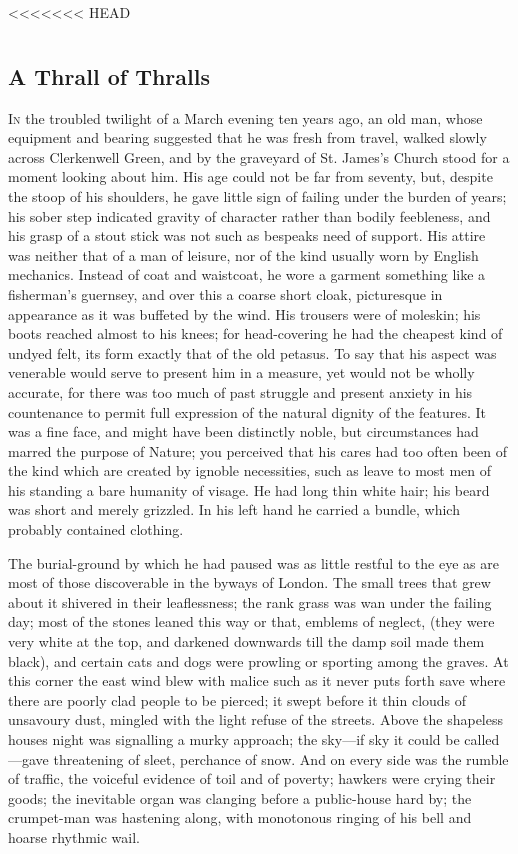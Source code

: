 <<<<<<< HEAD
\part{}

\chapter{A Thrall of Thralls}

\textsc{In} the troubled twilight of a March evening ten years ago, an
old man, whose equipment and bearing suggested that he was fresh from
travel, walked slowly across Clerkenwell Green, and by the graveyard of
St. James's Church stood for a moment looking about him. His age could
not be far from seventy, but, despite the stoop of his shoulders, he
gave little sign of failing under the burden of years; his sober step
indicated gravity of character rather than bodily feebleness, and his
grasp of a stout stick was not such as bespeaks need of support. His
attire was neither that of a man of leisure, nor of the kind usually
worn by English {}mechanics. Instead of coat and waistcoat, he wore a
garment something like a fisherman's guernsey, and over this a coarse
short cloak, picturesque in appearance as it was buffeted by the wind.
His trousers were of moleskin; his boots reached almost to his knees;
for head-covering he had the cheapest kind of undyed felt, its form
exactly that of the old petasus. To say that his aspect was venerable
would serve to present him in a measure, yet would not be wholly
accurate, for there was too much of past struggle and present anxiety in
his countenance to permit full expression of the natural dignity of the
features. It was a fine face, and might have been distinctly noble, but
circumstances had marred the purpose of Nature; you perceived that his
cares had too often been of the kind which are created by ignoble
necessities, such as leave to most men of his standing a bare humanity
of visage. He had long thin white hair; his beard was short and merely
grizzled. In his left hand he carried a bundle, which probably contained
clothing.

{}The burial-ground by which he had paused was as little restful to the
eye as are most of those discoverable in the byways of London. The small
trees that grew about it shivered in their leaflessness; the rank grass
was wan under the failing day; most of the stones leaned this way or
that, emblems of neglect, (they were very white at the top, and darkened
downwards till the damp soil made them black), and certain cats and dogs
were prowling or sporting among the graves. At this corner the east wind
blew with malice such as it never puts forth save where there are poorly
clad people to be pierced; it swept before it thin clouds of unsavoury
dust, mingled with the light refuse of the streets. Above the shapeless
houses night was signalling a murky approach; the sky---if sky it could
be called---gave threatening of sleet, perchance of snow. And on every
side was the rumble of traffic, the voiceful evidence of toil and of
poverty; hawkers were crying their goods; the inevitable organ was
clanging before a public-house hard by; {}the crumpet-man was hastening
along, with monotonous ringing of his bell and hoarse rhythmic wail.

